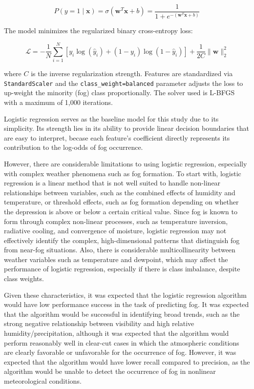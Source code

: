 \documentclass[
  letterpaper,
  DIV=11,
  numbers=noendperiod]{scrartcl}
\begin{document}
\[P(y = 1 \mid \mathbf{x}) = \sigma(\mathbf{w}^T \mathbf{x} + b) = \frac{1}{1 + e^{-(\mathbf{w}^T \mathbf{x} + b)}}\]

The model minimizes the regularized binary cross-entropy loss:

\[\mathcal{L} = -\frac{1}{N} \sum_{i=1}^{N} \left[ y_i \log(\hat{y}_i) + (1 - y_i) \log(1 - \hat{y}_i) \right] + \frac{1}{2C} \|\mathbf{w}\|_2^2\]

where \(C\) is the inverse regularization strength. Features are
standardized via \texttt{StandardScaler} and the
\texttt{class\_weight=\textquotesingle{}balanced\textquotesingle{}}
parameter adjusts the loss to up-weight the minority (fog) class
proportionally. The solver used is L-BFGS with a maximum of 1,000
iterations.

Logistic regression serves as the baseline model for this study due to
its simplicity. Its strength lies in its ability to provide linear
decision boundaries that are easy to interpret, becase each feature's
coefficient directly represents its contribution to the log-odds of fog
occurrence.

However, there are considerable limitations to using logistic
regression, especially with complex weather phenomena such as fog
formation. To start with, logistic regression is a linear method that is
not well suited to handle non-linear relationships between variables,
such as the combined effects of humidity and temperature, or threshold
effects, such as fog formation depending on whether the depression is
above or below a certain critical value. Since fog is known to form
through complex non-linear processes, such as temperature inversion,
radiative cooling, and convergence of moisture, logistic regression may
not effectively identify the complex, high-dimensional patterns that
distinguish fog from near-fog situations. Also, there is considerable
multicollinearity between weather variables such as temperature and
dewpoint, which may affect the performance of logistic regression,
especially if there is class imbalance, despite class weights.

Given these characteristics, it was expected that the logistic
regression algorithm would have low performance success in the task of
predicting fog. It was expected that the algorithm would be successful
in identifying broad trends, such as the strong negative relationship
between visibility and high relative humidity/precipitation, although it
was expected that the algorithm would perform reasonably well in
clear-cut cases in which the atmospheric conditions are clearly
favorable or unfavorable for the occurrence of fog. However, it was
expected that the algorithm would have lower recall compared to
precision, as the algorithm would be unable to detect the occurrence of
fog in nonlinear meteorological conditions.
\end{document}
